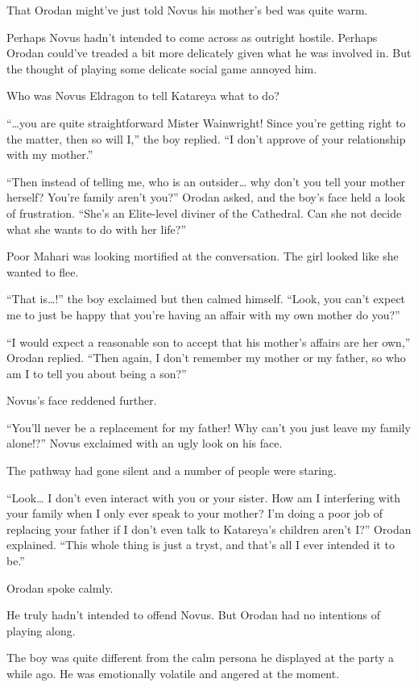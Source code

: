 \documentclass[a4paper,10pt]{book}
\begin{document}
That Orodan might’ve just told Novus his mother’s bed was quite warm.\par
Perhaps Novus hadn’t intended to come across as outright hostile. Perhaps Orodan could’ve treaded a bit more delicately given what he was involved in. But the thought of playing some delicate social game annoyed him.\par
Who was Novus Eldragon to tell Katareya what to do?\par
“…you are quite straightforward Mister Wainwright! Since you’re getting right to the matter, then so will I,” the boy replied. “I don’t approve of your relationship with my mother.”\par
“Then instead of telling me, who is an outsider… why don’t you tell your mother herself? You’re family aren’t you?” Orodan asked, and the boy’s face held a look of frustration. “She’s an Elite-level diviner of the Cathedral. Can she not decide what she wants to do with her life?”\par
Poor Mahari was looking mortified at the conversation. The girl looked like she wanted to flee.\par
“That is…!” the boy exclaimed but then calmed himself. “Look, you can’t expect me to just be happy that you’re having an affair with my own mother do you?”\par
“I would expect a reasonable son to accept that his mother’s affairs are her own,” Orodan replied. “Then again, I don’t remember my mother or my father, so who am I to tell you about being a son?”\par
Novus’s face reddened further.\par
“You’ll never be a replacement for my father! Why can’t you just leave my family alone!?” Novus exclaimed with an ugly look on his face.\par
The pathway had gone silent and a number of people were staring.\par
“Look… I don’t even interact with you or your sister. How am I interfering with your family when I only ever speak to your mother? I’m doing a poor job of replacing your father if I don’t even talk to Katareya’s children aren’t I?” Orodan explained. “This whole thing is just a tryst, and that’s all I ever intended it to be.”\par
Orodan spoke calmly.\par
He truly hadn't intended to offend Novus. But Orodan had no intentions of playing along.\par
The boy was quite different from the calm persona he displayed at the party a while ago. He was emotionally volatile and angered at the moment.\par
\end{document}
